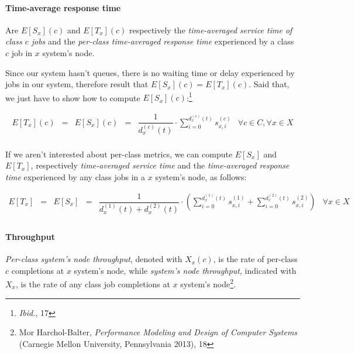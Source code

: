 \documentclass[10pt,a4paper]{article}
\begin{document}
\paragraph{Time-average response time}

Are $E[S_x](c)$ and $E[T_x](c)$ respectively the \textit{time-averaged service time of class $c$ jobs} and the \textit{per-class time-averaged response time} experienced by a class $c$ job in $x$ system's node. 

Since our system hasn't queues, there is no waiting time or delay experienced by jobs in our system, therefore result that $E[S_x](c) = E[T_x](c)$.
Said that, we just have to show how to compute $E[S_x](c)$:\footnote{\textit{Ibid.}, 17}

\begin{equation}
\begin{array} {rccccr} 
E[T_x](c) & = & E[S_x](c) & = & \displaystyle \dfrac{1}{d_x^{(c)}(t)} \cdot \sum_{i = 0}^{d_x^{(c)}(t)} s_{x,i}^{(c)} & \forall c \in C, \forall x \in X \\
\end{array}
\end{equation}

If we aren't interested about per-class metrics, we can compute $E[S_x]$ and $E[T_x]$, respectively \textit{time-averaged service time} and the \textit{time-averaged response time} experienced by any class jobs in a $x$ system's node, as follows:

\begin{equation}
\begin{array} {rccccr} 
E[T_x] & = & E[S_x] & = & \displaystyle \dfrac{1}{d_x^{(1)}(t) + d_x^{(2)}(t)} \cdot \left( \sum_{i = 0}^{d_x^{(1)}(t)} s_{x,i}^{(1)} + \sum_{i = 0}^{d_x^{(2)}(t)} s_{x,i}^{(2)} \right) & \forall x \in X \\
\end{array}
\end{equation}

\paragraph{Throughput}

\textit{Per-class system's node throughput}, denoted with $X_x(c)$, is the rate of per-class $c$ completions at $x$ system's node, while \textit{system's node throughput}, indicated with $X_x$, is the rate of any class job completions at $x$ system's node\footnote{Mor Harchol-Balter, \textit{Performance Modeling and Design of Computer Systems} (Carnegie Mellon University, Pennsylvania 2013), 18}. 
\end{document}
